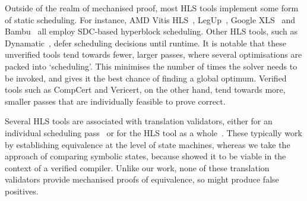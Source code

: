 {Outside of the realm of mechanised proof, most HLS tools implement some form of static scheduling. For instance, AMD Vitis HLS~\cite{amd23_vitis_forum}, LegUp~\cite[][p.60]{canis15_legup}, Google XLS~\cite[line~112]{googleXLS} and Bambu~\cite[line~304]{ferrandi2021bambu} all employ SDC-based hyperblock scheduling. Other HLS tools, such as Dynamatic~\cite{dynamatic}, defer scheduling decisions until runtime. It is notable that these unverified tools tend towards fewer, larger passes, where several optimisations are packed into `scheduling'. This minimises the number of times the solver needs to be invoked, and gives it the best chance of finding a global optimum. Verified tools such as CompCert and Vericert, on the other hand, tend towards more, smaller passes that are individually feasible to prove correct.

Several HLS tools are associated with translation validators, either for an individual scheduling pass~\cite{chouksey20_verif_sched_condit_behav_high_level_synth, karfa06_formal_verif_method_sched_high_synth, kim04_autom_fsmd} or for the HLS tool as a whole~\cite{mentor20_catap_high_level_synth, crest}. These typically work by establishing equivalence at the level of state machines, whereas we take the approach of comparing symbolic states, because \textcite{tristan08_formal_verif_trans_valid} showed it to be viable in the context of a verified compiler. Unlike our work, none of these translation validators provide mechanised proofs of equivalence, so might produce false positives.






}
